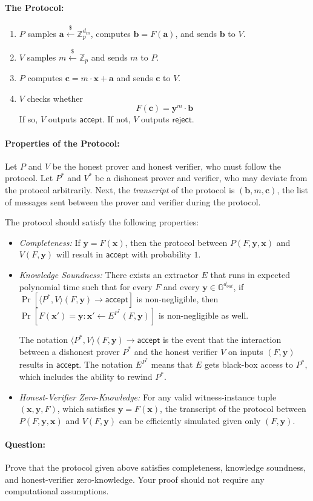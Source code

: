 \documentclass[11pt]{article}
\newenvironment{solution}{\color{blue}\noindent{\bf Solution}\hspace*{1em}}{\qed\medskip}
\newcommand{\qed}{\mbox{}\hspace*{\fill}\nolinebreak\mbox{$\rule{0.6em}{0.6em}$}} %
\numberwithin{equation}{section}
\newcommand{\bfa}{\mathbf{a}}
\newcommand{\bfb}{\mathbf{b}}
\newcommand{\bfc}{\mathbf{c}}
\newcommand{\bfx}{\mathbf{x}}
\newcommand{\bfy}{\mathbf{y}}
\newcommand{\bbG}{\mathbb{G}}
\newcommand{\bbZ}{\mathbb{Z}}
\newcommand{\getsr}{\stackrel{\$}{\gets}}
\newif\ifsol
\begin{document}
\paragraph{The Protocol:}
\begin{enumerate}
    \item $P$ samples $\bfa \getsr \bbZ_p^{d_{in}}$, computes $\bfb = F(\bfa)$, and sends $\bfb$ to $V$.
    \item $V$ samples $m \getsr \bbZ_p$ and sends $m$ to $P$.
    \item $P$ computes $\bfc = m \cdot \bfx + \bfa$ and sends $\bfc$ to $V$.
    \item $V$ checks whether
    \[F(\bfc) = \bfy^m \cdot \bfb\]
    If so, $V$ outputs $\mathsf{accept}$. If not, $V$ outputs $\mathsf{reject}$.
\end{enumerate}

\paragraph{Properties of the Protocol:}
Let $P$ and $V$ be the honest prover and honest verifier, who must follow the protocol. Let $P^*$ and $V^*$ be a dishonest prover and verifier, who may deviate from the protocol arbitrarily. Next, the \textit{transcript} of the protocol is $(\bfb, m, \bfc)$, the list of messages sent between the prover and verifier during the protocol.

The protocol should satisfy the following properties:
\begin{itemize}
    \item \textit{Completeness:} If $\bfy = F(\bfx)$, then the protocol between $P(F, \bfy, \bfx)$ and $V(F, \bfy)$ will result in $\mathsf{accept}$ with probability $1$.
    \item \textit{Knowledge Soundness:} There exists an extractor $E$ that runs in expected polynomial time such that for every $F$ and every $\bfy \in \bbG^{d_{out}}$, if $\Pr[\langle P^*, V \rangle(F, \bfy) \to \mathsf{accept}]$ is non-negligible, then $\Pr[F(\bfx') = \bfy : \bfx' \gets E^{P^*}(F, \bfy)]$ is non-negligible as well.
    
    The notation $\langle P^*, V \rangle(F, \bfy) \to \mathsf{accept}$ is the event that the interaction between a dishonest prover $P^*$ and the honest verifier $V$ on inputs $(F, \bfy)$ results in $\mathsf{accept}$. The notation $E^{P^*}$ means that $E$ gets black-box access to $P^*$, which includes the ability to rewind $P^*$.
    \item \textit{Honest-Verifier Zero-Knowledge:} For any valid witness-instance tuple $(\bfx, \bfy, F)$, which satisfies $\bfy = F(\bfx)$, the transcript of the protocol between $P(F, \bfy, \bfx)$ and $V(F, \bfy)$ can be efficiently simulated given only $(F, \bfy)$.
\end{itemize}

\paragraph{Question:} Prove that the protocol given above satisfies completeness, knowledge soundness, and honest-verifier zero-knowledge. Your proof should not require any computational assumptions.

\ifsol
\vspace{5mm}
\begin{solution}
TBD
\end{solution}
\fi
\end{document}
